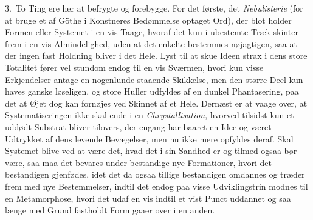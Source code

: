 \documentclass[12pt,a4paper]{book}
\newcommand{\apage}[1]{\marginnote{\footnotesize\textit{[#1]}}}
\begin{document}
3.~To Ting ere her at befrygte og forebygge. For det første, det
\emph{Nebulisterie} (for at bruge et af Göthe i Konstneres Bedømmelse optaget
Ord), der blot holder Formen eller Systemet i en vis Taage, hvoraf det kun i
ubestemte Træk skinter frem i en vis Almindelighed, uden at det enkelte bestemmes
nøjagtigen, saa at der ingen fast Holdning bliver i det Hele. Lyst til \apage{138} at skue
Ideen strax i dens store Totalitet fører vel stundom endog til en vis Sværmen,
hvori kun visse Erkjendelser antage en nogenlunde staaende Skikkelse, men den
større Deel kun haves ganske løseligen, og store Huller udfyldes af en dunkel
Phantasering, paa det at Øjet dog kan fornøjes ved Skinnet af et Hele. Dernæst er
at vaage over, at Systematiseringen ikke skal ende i en \emph{Chrystallisation},
hvorved tilsidst kun et uddødt Substrat bliver tilovers, der engang har baaret en
Idee og været Udtrykket af dens levende Bevægelser, men nu ikke mere opfyldes
deraf. Skal Systemet blive ved at være det, hvad det i sin Sandhed er og tilmed
ogsaa bør være, saa maa det bevares under bestandige nye Formationer, hvori det
bestandigen gjenfødes, idet det da ogsaa tillige bestandigen omdannes og træder
frem med nye Bestemmelser, indtil det endog paa visse Udviklingstrin modnes til en
Metamorphose, hvori det udaf en vis indtil et vist Punct uddannet og saa længe med
Grund fastholdt Form gaaer over i en anden.
\end{document}

